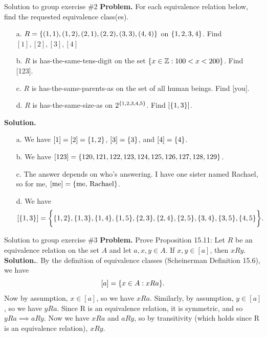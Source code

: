 \documentclass[10pt]{beamer}
\begin{document}
\begin{frame}{Solution to group exercise \#2}
\footnotesize 
\textbf{Problem.} For each equivalence relation below, find the requested equivalence class(es).
	\begin{itemize} \footnotesize 
	\item[a.] $R=\{ {(1,1), (1,2), (2,1), (2,2), (3,3), (4,4)} \} $ on $\{ {1,2,3,4} \}$. Find $[1],[2],[3],[4]$
	\item[b.] $R$ is has-the-same-tens-digit on the set $\{ {x \in \mathbb{Z} : 100 < x < 200} \}$.  Find [123].
	\item[c.] $R$ is has-the-same-parents-as on the set of all human beings.  Find [you].
	\item[d.] $R$ is has-the-same-size-as on $2^{\{ {1,2,3,4,5} \}}$.  Find $[\{ {1,3} \}]$.
	\end{itemize}
\vfill 
\textbf{Solution.} 
	\begin{itemize} \footnotesize 
	\item[a.] We have $[1]=[2]=\{ {1,2} \}$, $[3]=\{ {3} \}$, and $[4]=\{ {4} \}$.
	\item[b.] We have $[123]=\{ {120,121,122,123,124,125,126,127,128,129} \}$.
	\item[c.] The answer depends on who's answering.  I have one sister named Rachael, so for me, $[\text{me}]=\{ {\text{me, Rachael}} \}$.
	\item[d.] We have 
	\[ [\{ {1,3} \}] = \bigg\{ \{ {1,2} \}, \{ {1,3} \}, \{ {1,4} \}, \{ {1,5} \}, \{ {2,3} \}, \{ {2,4} \}, \{ {2,5} \}, \{ {3,4} \}, \{ {3,5} \}, \{ {4,5} \} \bigg\}.\]
	\end{itemize}
\end{frame}


\begin{frame}{Solution to group exercise \#3}
\textbf{Problem.}  Prove Proposition 15.11:  Let $R$ be an equivalence relation on the set $A$ and let $a,x,y \in A$. If $x,y \in [a]$, then $xRy$.
\vfill 
\textbf{Solution.}. By the definition of equivalence classes (Scheinerman Definition 15.6), we have
%
\[ [a] =\{ {x \in A : xRa} \}.\]
%
Now by assumption, $x \in [a]$, so we have $xRa$.  Similarly, by assumption, $y \in [a]$, so we have $yRa$.  Since R is an equivalence relation, it is symmetric, and so $yRa \implies aRy$.   Now we have $xRa$ and $aRy$, so by transitivity (which holds since R is an equivalence relation), $xRy$.
\end{frame}
\end{document}
